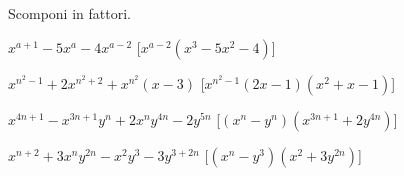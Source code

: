 
\begin{esercizio}[\Ast]
 \label{ese:17.45}
 Scomponi in fattori.
 \begin{enumeratea}
  \item $x^{a+1}-5x^{a}-4x^{a-2}$
  \hfill [$x^{a-2}(x^{3}-5x^{2}-4)$]
\item $x^{n^{2}-1}+2x^{n^{2}+2}+x^{n^{2}}(x-3)$
  \hfill [$x^{n^{2}-1}(2x-1)(x^{2}+x-1)$]
\item $x^{4n+1}-x^{3n+1}y^{n}+2x^{n}y^{4n}-2y^{5n}$
  \hfill [$(x^{n}-y^{n})(x^{3n+1}+2y^{4n})$]
\item $x^{n+2}+3x^{n}y^{2n}-x^{2}y^{3}-3y^{3+2n}$
  \hfill [$(x^{n}-y^{3})(x^{2}+3y^{2n})$]
 \end{enumeratea}
\end{esercizio}

